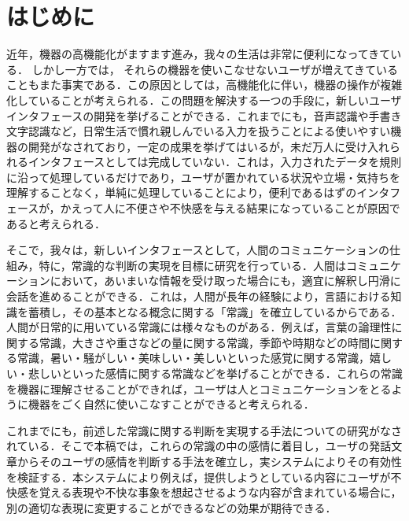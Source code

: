 \documentclass[japanese]{jnlp_1.3a}
\begin{document}
\maketitle



\section{はじめに}

近年，機器の高機能化がますます進み，我々の生活は非常に便利になってきている．
しかし一方では，
それらの機器を使いこなせないユーザが増えてきていることもまた事実である．この原因としては，高機能化に伴い，機器の操作が複雑化していることが考えられる．この問題を解決する一つの手段に，新しいユーザインタフェースの開発を挙げることができる．これまでにも，音声認識や手書き文字認識など，日常生活で慣れ親しんでいる入力を扱うことによる使いやすい機器の開発がなされており，一定の成果を挙げてはいるが，未だ万人に受け入れられるインタフェースとしては完成していない．これは，入力されたデータを規則に沿って処理しているだけであり，ユーザが置かれている状況や立場・気持ちを理解することなく，単純に処理していることにより，便利であるはずのインタフェースが，かえって人に不便さや不快感を与える結果になっていることが原因であると考えられる．

そこで，我々は，新しいインタフェースとして，人間のコミュニケーションの仕組み，特に，常識的な判断の実現を目標に研究を行っている．人間はコミュニケーションにおいて，あいまいな情報を受け取った場合にも，適宜に解釈し円滑に会話を進めることができる．これは，人間が長年の経験により，言語における知識を蓄積し，その基本となる概念に関する「常識」を確立しているからである．人間が日常的に用いている常識には様々なものがある．例えば，言葉の論理性に関する常識，大きさや重さなどの量に関する常識，季節や時期などの時間に関する常識，暑い・騒がしい・美味しい・美しいといった感覚に関する常識，嬉しい・悲しいといった感情に関する常識などを挙げることができる．これらの常識を機器に理解させることができれば，ユーザは人とコミュニケーションをとるように機器をごく自然に使いこなすことができると考えられる．

これまでにも，前述した常識に関する判断を実現する手法についての研究がなされている\cite{horiguchi:02,watabe:04,kometani:03,tsuchiya:05}．そこで本稿では，これらの常識の中の感情に着目し，ユーザの発話文章からそのユーザの感情を判断する手法を確立し，実システムによりその有効性を検証する．本システムにより例えば，提供しようとしている内容にユーザが不快感を覚える表現や不快な事象を想起させるような内容が含まれている場合に，別の適切な表現に変更することができるなどの効果が期待できる．
\end{document}

